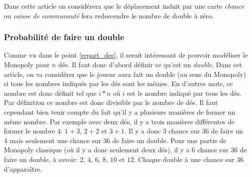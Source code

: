 \documentclass[letterpaper]{article}
\begin{document}
      Dans cette article on considérera que le déplacement induit par une carte
      \textit{chance} ou \textit{caisse de communauté} fera redescendre le nombre
      de double à zéro.
      
    \subsubsection{Probabilité de faire un double}
      \label{prob_double}
      Comme vu dans le point \ref{repart_des}, il serait intéressant de 
      pouvoir modéliser le Monopoly pour $n$ dés.  Il faut donc d'abord
      définir ce qu'est un \textit{double}.  Dans cet article, on va
      considérer que le joueur aura fait un double (au sens du Monopoly)
      si tous les nombres indiqués par les dés sont les mêmes. En d'autres
      mots, ce nombre est donc définit tel que $i*n$ où $i$ est le nombre
      indiqué par tous les dés.  Par définition ce nombre est donc 
      divisible par le nombre de dés.
      Il faut cependant bien tenir compte du fait qu'il y a plusieurs
      manières de former un même nombre.  Par exemple avec deux dés, 
      il y a trois manières différentes de former le nombre $4$: 
      $1+3$, $2+2$ et $3+1$.  Il y a donc 3 chance sur 36 de faire un 
      $4$ mais seulement une chance sur 36 de faire un double.
      Pour une partie de Monopoly classique (où il y a donc seulement
      deux dés), il y a 6 chance sur 36 de faire un double, à savoir:
      $2$, $4$, $6$, $8$, $10$ et $12$.  Chaque double à une chance
      sur 36 d'apparaître.
    
\end{document}
